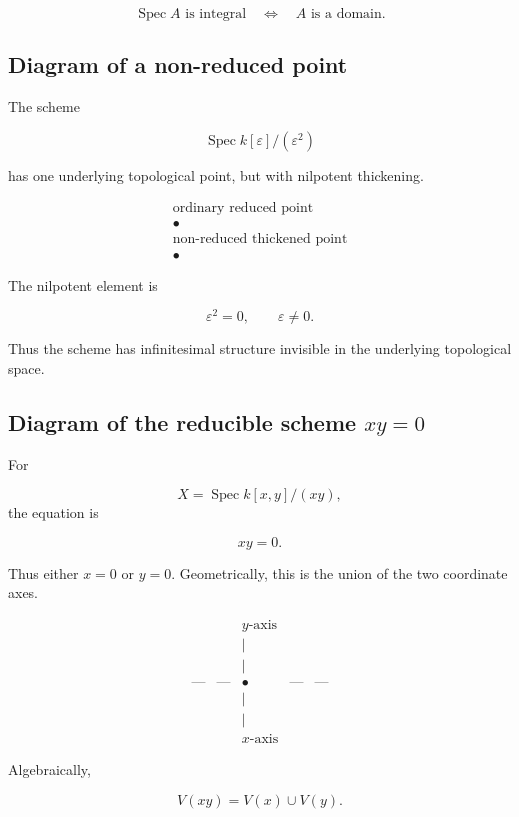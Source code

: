 \documentclass[12pt,a4paper]{article}
\theoremstyle{notespace}
\begin{document}
\[
\boxed{
	\operatorname{Spec}A\text{ is integral}
	\quad\Longleftrightarrow\quad
	A\text{ is a domain}.
}
\]

\subsection{Diagram of a non-reduced point}

The scheme

\[
\operatorname{Spec}k[\varepsilon]/(\varepsilon^2)
\]

has one underlying topological point, but with nilpotent thickening.

\[
\begin{array}{c}
	\text{ordinary reduced point}
	\\[4pt]
	\bullet
	\\[12pt]
	\text{non-reduced thickened point}
	\\[4pt]
	\boxed{\bullet}
\end{array}
\]

The nilpotent element is

\[
\varepsilon^2=0,
\qquad
\varepsilon\neq 0.
\]

Thus the scheme has infinitesimal structure invisible in the underlying topological space.

\subsection{Diagram of the reducible scheme \(xy=0\)}

For

\[
X=\operatorname{Spec}k[x,y]/(xy),
\]
the equation is

\[
xy=0.
\]

Thus either \(x=0\) or \(y=0\). Geometrically, this is the union of the two coordinate axes.

\[
\begin{array}{ccccc}
	&& y\text{-axis} &&
	\\[-2pt]
	&& | &&
	\\[-2pt]
	&& | &&
	\\[-2pt]
	\text{---} & \text{---} & \bullet & \text{---} & \text{---}
	\\[-2pt]
	&& | &&
	\\[-2pt]
	&& | &&
	\\[2pt]
	&& x\text{-axis} &&
\end{array}
\]

Algebraically,

\[
V(xy)=V(x)\cup V(y).
\]
\end{document}
